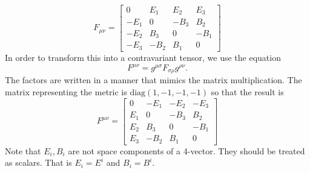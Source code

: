 \begin{enumerate}
\begin{equation}
F_{\mu\nu} = 
\begin{bmatrix}
0 & E_1 & E_2 & E_3 \\
-E_1 & 0 & -B_3 & B_2\\
-E_2 & B_3 & 0 & -B_1\\
-E_3 & -B_2 & B_1 & 0
\end{bmatrix}
\end{equation}
In order to transform this into a contravariant tensor, we use the equation
\begin{equation}\label{c3e76}
F^{\mu\nu} = g^{\mu\sigma}F_{\sigma\rho}g^{\rho\nu}.
\end{equation}
The factors are written in a manner that mimics the matrix multiplication. The matrix
representing the metric is $\text{diag}(1, -1, -1, -1)$ so that the result is
\begin{equation}\label{c3e77}
F^{\mu\nu} = 
\begin{bmatrix}
0 & -E_1 & -E_2 & -E_3 \\
E_1 & 0 & -B_3 & B_2\\
E_2 & B_3 & 0 & -B_1\\
E_3 & -B_2 & B_1 & 0
\end{bmatrix}
\end{equation}
Note that $E_i, B_i$ are not space components of a 4-vector. They should be treated
as scalars. That is $E_i = E^i$ and $B_i = B^i$.



\end{enumerate}
